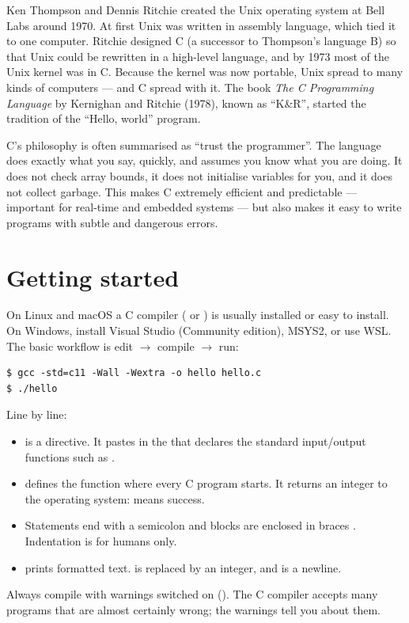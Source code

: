 \begin{history}
Ken Thompson and Dennis Ritchie created the Unix operating system at Bell Labs around 1970.
At first Unix was written in assembly language, which tied it to one computer. Ritchie
designed C (a successor to Thompson's language B) so that Unix could be rewritten in a
high-level language, and by 1973 most of the Unix kernel was in C. Because the kernel was
now portable, Unix spread to many kinds of computers --- and C spread with it. The book
\emph{The C Programming Language} by Kernighan and Ritchie (1978), known as ``K\&R'',
started the tradition of the ``Hello, world'' program.
\end{history}

C's philosophy is often summarised as ``trust the programmer''. The language does exactly
what you say, quickly, and assumes you know what you are doing. It does not check array
bounds, it does not initialise variables for you, and it does not collect garbage. This
makes C extremely efficient and predictable --- important for real-time and embedded
systems --- but also makes it easy to write programs with subtle and dangerous errors.

\section{Getting started}

On Linux and macOS a C compiler ( or ) is usually installed or easy
to install. On Windows, install Visual Studio (Community edition), MSYS2, or use WSL. The
basic workflow is edit $\to$ compile $\to$ run:
\begin{lstlisting}[style=shell]
$ gcc -std=c11 -Wall -Wextra -o hello hello.c
$ ./hello
\end{lstlisting}
Line by line:
\begin{itemize}
\item {} is a  directive. It pastes in the
   that declares the standard input/output functions such as
  .
\item {} defines the function where every C program starts. It returns
  an integer to the operating system:  means success.
\item Statements end with a semicolon \code{;} and blocks are enclosed in braces
  \code{\{ \}}. Indentation is for humans only.
\item {} prints formatted text.  is replaced by an integer, and
   is a newline.
\end{itemize}
Always compile with warnings switched on (). The C compiler accepts
many programs that are almost certainly wrong; the warnings tell you about them.

